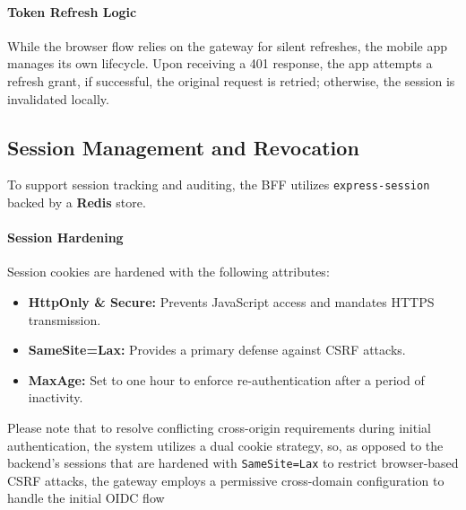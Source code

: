 \paragraph{Token Refresh Logic}
While the browser flow relies on the gateway for silent refreshes, the mobile app manages its own lifecycle. 
Upon receiving a 401 response, the app attempts a refresh grant,
if successful, the original request is retried; otherwise, the session is invalidated locally.

\subsection{Session Management and Revocation}

To support session tracking and auditing, the BFF utilizes \texttt{express-session} backed by a \textbf{Redis} store.

\paragraph{Session Hardening}
Session cookies are hardened with the following attributes:
\begin{itemize}
    \item \textbf{HttpOnly \& Secure:} Prevents JavaScript access and mandates HTTPS transmission.
    \item \textbf{SameSite=Lax:} Provides a primary defense against \ac{CSRF} attacks.
    \item \textbf{MaxAge:} Set to one hour to enforce re-authentication after a period of inactivity.
\end{itemize}

Please note that to resolve conflicting cross-origin requirements during initial authentication, the system utilizes a dual cookie strategy, so, as opposed to the backend's sessions that are hardened with \texttt{SameSite=Lax} to restrict browser-based CSRF attacks, the gateway employs a permissive cross-domain configuration to handle the initial OIDC flow




